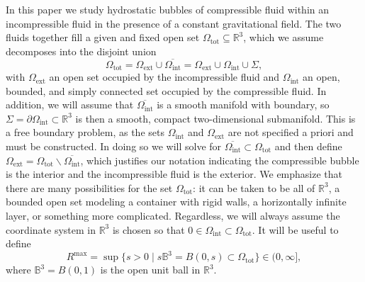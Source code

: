 \documentclass[11pt,reqno]{amsart}
\numberwithin{equation}{section}
\def\p{\partial}
\def\p{\partial}
\newcommand{\m}{\mathrm}
\def\R{\mathbb{R}}
\def\st{\;\vert\;}
\begin{document}
 
In this paper we study hydrostatic bubbles of compressible fluid within an incompressible fluid in the presence of a constant gravitational field.     The two fluids together fill a given and fixed open set $\Omega_{\m{tot}} \subseteq \R^3$, which we assume decomposes into the disjoint union 
\begin{equation}
\Omega_{\m{tot}} = \Omega_{\m{ext}} \cup \overline{\Omega_{\m{int}}} = \Omega_{\m{ext}} \cup \Omega_{\m{int}} \cup \Sigma,    
\end{equation}
with $\Omega_{\m{ext}}$ an open set occupied by the incompressible fluid and  $\Omega_{\m{int}}$ an open, bounded, and simply connected set occupied by the compressible fluid.  In addition, we will assume that $\overline{\Omega_{\m{int}}}$ is a smooth manifold with boundary, so $\Sigma = \p \Omega_{\m{int}} \subset \R^3$  is then a smooth, compact two-dimensional submanifold.  This is a free boundary problem, as the sets $\Omega_{\m{int}}$ and $\Omega_{\m{ext}}$ are not specified a priori and must be constructed.  In doing so we will solve for $\overline{\Omega_{\m{int}}} \subset \Omega_{\m{tot}}$ and then define $\Omega_{\m{ext}} = \Omega_{\m{tot}} \backslash \overline{\Omega_{\m{int}}}$, which justifies our notation indicating the compressible bubble is the interior and the incompressible fluid is the exterior.  We emphasize that there are many possibilities for the set $\Omega_{\m{tot}}$: it can be taken to be all of $\R^3$, a bounded open set modeling a container with rigid walls, a horizontally infinite layer, or something more complicated.  Regardless, we will always assume the coordinate system in $\R^3$ is chosen so that $0 \in \Omega_{\m{int}} \subset  \Omega_{\m{tot}} $.  It will be useful to define 
\begin{equation}\label{R_max_def}
 R^{\m{max}} = \sup\{ s >0 \st s \mathbb{B}^3 = B(0,s) \subset \Omega_{\m{tot}}   \} \in (0,\infty],
\end{equation}
where $\mathbb{B}^3= B(0,1)$ is the open unit ball in $\R^3$. 
\end{document}
